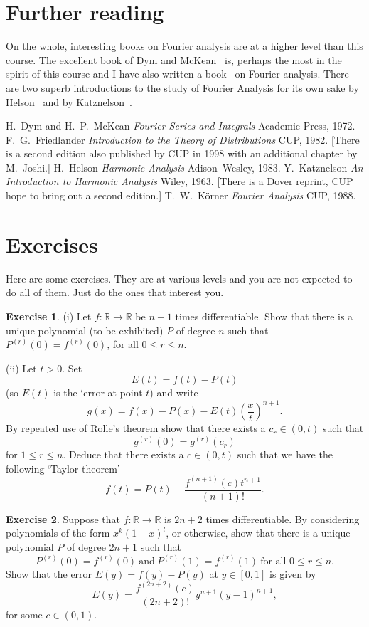 \documentclass[12pt]{article}
\theoremstyle{definition}
\newtheorem{question}{Exercise}[section]
\begin{document}
\section{Further reading} On the whole, interesting books on
Fourier analysis are at a higher level than this course.
The excellent book of Dym and McKean~\cite{Dym} is, perhaps the
most in the spirit of this course and I have also written
a book~\cite{Korner1} on Fourier analysis. There are two 
superb introductions to the study of Fourier Analysis
for its own sake by Helson~\cite{Helson} and
by Katznelson~\cite{Katznelson}.
\begin{thebibliography}{9}
 H.~Dym and H.~P.~McKean
\emph{Fourier Series and Integrals}
Academic Press, 1972.
 F.~G.~Friedlander
\emph{Introduction to the Theory of Distributions}
CUP, 1982. [There is a second edition 
also published by CUP in 1998 with
an additional chapter by M.~Joshi.]
 H.~Helson
\emph{Harmonic Analysis}
Adison--Wesley, 1983.
 Y.~Katznelson
\emph{An Introduction to Harmonic Analysis}
Wiley, 1963. [There is a Dover reprint, CUP hope to
bring out a second edition.]
 T.~W.~K\"{o}rner
\emph{Fourier Analysis}
CUP, 1988.
\end{thebibliography}
\section{Exercises} Here are some exercises. They are at various
levels and you are not expected to do all of them. Just do the
ones that interest you.
\begin{question} (i) Let $f:{\mathbb R}\rightarrow{\mathbb R}$
be $n+1$ times differentiable. Show that there is a unique
polynomial (to be exhibited) $P$ of degree $n$ such that
$P^{(r)}(0)=f^{(r)}(0)$, for all $0\leq r\leq n$.

(ii) Let $t>0$. Set
\[E(t)=f(t)-P(t)\]
(so $E(t)$ is the `error at point $t$) and write
\[g(x)=f(x)-P(x)-E(t)\left(\frac{x}{t}\right)^{n+1}.\]
By repeated use of Rolle's theorem show that
there exists a $c_{r}\in(0,t)$ such that
\[g^{(r)}(0)=g^{(r)}(c_{r})\]
for $1\leq r\leq n$. Deduce that there exists a $c\in(0,t)$
such that we have the following `Taylor theorem'
\[f(t)=P(t)+\frac{f^{(n+1)}(c)t^{n+1}}{(n+1)!}.\]
\end{question}

\begin{question}
Suppose that $f:{\mathbb R}\rightarrow{\mathbb R}$
is $2n+2$ times differentiable. By considering polynomials
of the form $x^{k}(1-x)^{l}$, or otherwise, show that
there is a unique polynomial $P$ of degree $2n+1$
such that
\[P^{(r)}(0)=f^{(r)}(0)\ \text{and}\ P^{(r)}(1)=f^{(r)}(1)
\ \text{for all $0\leq r\leq n$}.\]
Show that the error $E(y)=f(y)-P(y)$ at $y\in[0,1]$
is given by
\[E(y)=\frac{f^{(2n+2)}(c)}{(2n+2)!}y^{n+1}(y-1)^{n+1},\]
for some $c\in(0,1)$.
\end{question}
\end{document}
